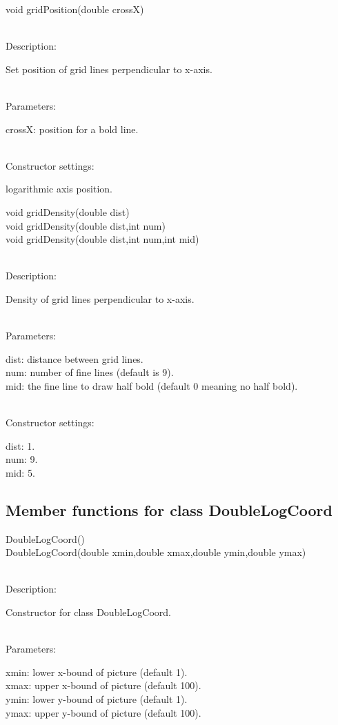 \documentclass[12pt,a4paper]{article}
\newcommand{\memberitem}[1]{
                              \vspace{-0.5pc}
                              \end{minipage}\\
                              \phantom{M}#1:\\
                              \phantom{MM}
                              \begin{minipage}[t]{12cm}

                           }
\newcommand{\memdsc}{\memberitem{Description}}
\newcommand{\meminp}{\memberitem{Parameters}}
\newcommand{\memdef}{\memberitem{Constructor settings}}
\newenvironment{MemberDescr}
  {
    \begin{minipage}{15cm}
    \bf
  }
  {
    \end{minipage}
  }
\begin{document}
  \begin{MemberDescr}
    void gridPosition(double crossX)\\
    \memdsc
      Set position of grid lines perpendicular to x-axis.\\
    \meminp
      crossX: position for a bold line.\\
    \memdef
      logarithmic axis position.\\
  \end{MemberDescr}

  \begin{MemberDescr}
    void gridDensity(double dist)\\
    void gridDensity(double dist,int num)\\
    void gridDensity(double dist,int num,int mid)\\
    \memdsc
      Density of grid lines perpendicular to x-axis.\\
    \meminp
      dist: distance between grid lines.\\
      num:  number of fine lines (default is 9).\\
      mid:  the fine line to draw half bold (default 0 meaning no half bold).\\
    \memdef
      dist: 1.\\
      num:  9.\\
      mid:  5.\\
  \end{MemberDescr}


  \subsection{Member functions for class DoubleLogCoord}

  \begin{MemberDescr}
    DoubleLogCoord()\\
    DoubleLogCoord(double xmin,double xmax,double ymin,double ymax)\\
    \memdsc
      Constructor for class DoubleLogCoord.\\
    \meminp
      xmin: lower x-bound of picture (default 1).\\
      xmax: upper x-bound of picture (default 100).\\
      ymin: lower y-bound of picture (default 1).\\
      ymax: upper y-bound of picture (default 100).\\
  \end{MemberDescr}
\end{document}
